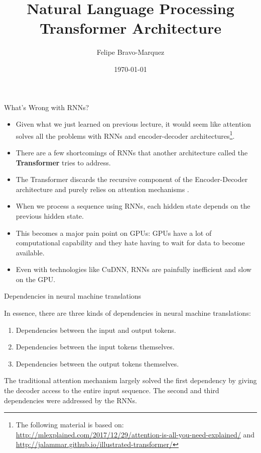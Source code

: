 \documentclass[handout]{beamer}
\title{Natural Language Processing \\ Transformer Architecture}
\author[Felipe Bravo Márquez]{\footnotesize
 \textcolor[rgb]{0.00,0.00,1.00}{Felipe Bravo-Marquez}}
\date{\today}
\begin{document}
\begin{frame}
\titlepage


\end{frame}



\begin{frame}{What's Wrong with RNNs?}
\begin{scriptsize}
\begin{itemize}
\item Given what we just learned on previous lecture, it would seem like attention solves all the problems with RNNs and encoder-decoder architectures\footnote{The following material is based on: \url{http://mlexplained.com/2017/12/29/attention-is-all-you-need-explained/} and \url{http://jalammar.github.io/illustrated-transformer/}}.

\item There are a few shortcomings of RNNs that another architecture called the \textbf{Transformer} tries to address.

\item The Transformer discards the recursive component of the Encoder-Decoder architecture and purely relies on attention mechanisms \cite{vaswani2017attention}.

\item When we process a sequence using RNNs, each hidden state depends on the previous hidden state. 

\item This becomes a major pain point on GPUs: GPUs have a lot of computational capability and they hate having to wait for data to become available.

\item Even with technologies like CuDNN, RNNs are painfully inefficient and slow on the GPU.


\end{itemize}
\end{scriptsize}
\end{frame}

\begin{frame}{Dependencies in neural machine translations}
\begin{scriptsize}
In essence, there are three kinds of dependencies in neural machine translations: 
\begin{enumerate}
\item Dependencies between the input and output tokens.

\item Dependencies between the input tokens themselves.

\item Dependencies between the output tokens themselves.
\end{enumerate}


The traditional attention mechanism largely solved the first dependency by giving the decoder access to the entire input sequence. The second and third dependencies were addressed by the RNNs.

\end{scriptsize}

\end{frame}
\end{document}
